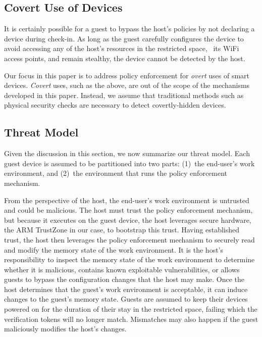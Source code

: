 \subsection{Covert Use of Devices}
%
It is certainly possible for a guest to bypass the host's policies by not
declaring a device during check-in. As long as the guest carefully configures
the device to avoid accessing any of the host's resources in the restricted
space, \eg~its WiFi access points, and remain stealthy, the device cannot be
detected by the host.

Our focus in this paper is to address policy enforcement for \textit{overt}
uses of smart devices. \textit{Covert} uses, such as the above, are out of the
scope of the mechanisms developed in this paper. Instead, we assume that
traditional methods such as physical security checks are necessary to detect
covertly-hidden devices.

\subsection{Threat Model} 
\label{section:threat}
%
Given the discussion in this section, we now summarize our threat model. 
Each guest device is assumed to be partitioned into two parts: (1)~the
end-user's work environment, and (2)~the environment that runs the policy
enforcement mechanism. 

From the perspective of the host, the end-user's work environment is untrusted
and could be malicious. The host must trust the policy enforcement mechanism,
but because it executes on the guest device, the host leverages secure
hardware, the ARM TrustZone in our case, to bootstrap this trust. Having
established trust, the host then leverages the policy enforcement mechanism to
securely read and modify the memory state of the work environment. It is the
host's responsibility to inspect the memory state of the work environment to
determine whether it is malicious, contains known exploitable vulnerabilities,
or allows guests to bypass the configuration changes that the host may make.
Once the host determines that the guest's work environment is acceptable, it
can induce changes to the guest's memory state. Guests are assumed to keep
their devices powered on for the duration of their stay in the restricted
space, failing which the verification tokens will no longer match. Mismatches
may also happen if the guest maliciously modifies the host's changes.


